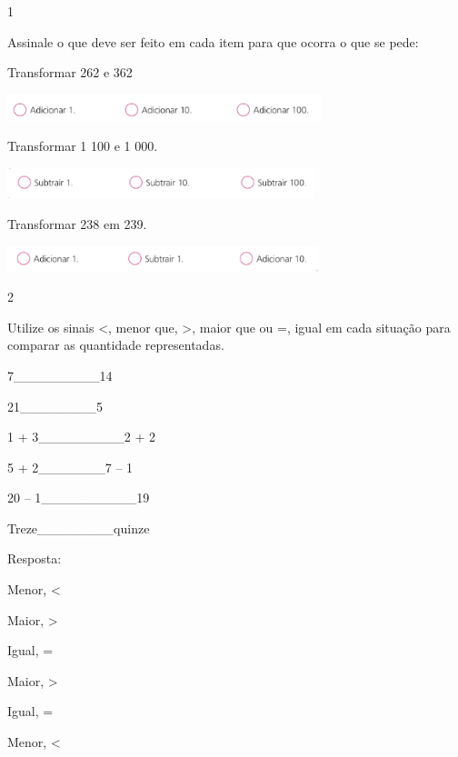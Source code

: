 
\num{1}

Assinale o que deve ser feito em cada item para que ocorra o que se
pede:

\begin{escolha}

\item
  Transformar 262 e 362

\includegraphics[width=3.60031in,height=0.30003in]{media/image18.png}

\item
  Transformar 1 100 e 1 000.

\includegraphics[width=3.51697in,height=0.35003in]{media/image19.png}

\item
  Transformar 238 em 239.

\includegraphics[width=3.56698in,height=0.29169in]{media/image20.png}
\end{escolha}

\num{2}

Utilize os sinais \textless{}, menor que, \textgreater{}, maior que ou
=, igual em cada situação para comparar as quantidade representadas.

\begin{escolha}

\item
  7\_\_\_\_\_\_\_\_\_14
\item
  21\_\_\_\_\_\_\_\_5
\item
  1 + 3\_\_\_\_\_\_\_\_\_2 + 2
\item
  5 + 2\_\_\_\_\_\_\_7 -- 1
\item
  20 -- 1\_\_\_\_\_\_\_\_\_\_19
\item
  Treze\_\_\_\_\_\_\_\_quinze
\end{escolha}

Resposta:

\begin{escolha}

\item
  Menor, \textless{}
\item
  Maior, \textgreater{}
\item
  Igual, =
\item
  Maior, \textgreater{}
\item
  Igual, =
\item
  Menor, \textless{}
\end{escolha}

